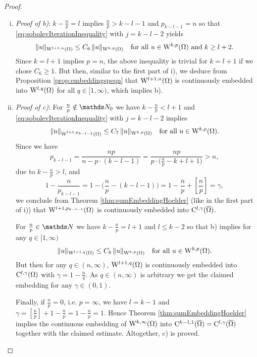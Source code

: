 \begin{proof}
\begin{enumerate}[i)]
\item \emph{Proof of b)}:
  $k - \frac{n}{p} = l$ implies $\frac{n}{p} > k - l - 1$ and $p_{k - l - 1} = n$ so that \eqref{eq:sobolevIterationInequality} with $j = k - l - 2$ yields
  $$
  \|u\|_{\mathrm{W}^{l + 1, n}(\Omega)} \leq C_6 \, \|u\|_{\mathrm{W}^{k,p}(\Omega)} \quad\text{for all } u \in \mathrm{W}^{k,p}(\Omega) \text{ and } k \geq l + 2.
  $$
  Since $k = l+1$ implies $p = n$, the above inequality is trivial for $k = l + 1$ if we chose $C_6 \geq 1$.
  But then, similar to the first part of i), we deduce from Proposition \ref{prop:embeddingspeqn} that $\mathrm{W}^{l+1,n}(\Omega)$ is continuously embedded into $\mathrm{W}^{l,q}(\Omega)$ for all $q \in [1,\infty)$, which implies b).
    
  \item \emph{Proof of c)}: For $\frac{n}{p} \notin\N_0$ we have $k - \frac{n}{p} < l + 1$ and \eqref{eq:sobolevIterationInequality} with $j = k - l - 2$ implies
    $$
  \|u\|_{\mathrm{W}^{l+1,p_{k - l - 1}}(\Omega)} \leq C_7 \, \|u\|_{\mathrm{W}^{k,p}(\Omega)} \quad\text{for all } u \in \mathrm{W}^{k,p}(\Omega).
    $$
    Since we have 
    $$
    p_{k - l - 1} = \frac{np}{n - p \cdot (k - l - 1)} = \frac{np}{p\cdot \Big( \frac{n}{p} - k + l + 1 \Big)} > n,
    $$ 
    due to $k - \frac{n}{p} > l$, and 
    $$
    1 - \frac{n}{p_{k - l - 1}} 
    = 1 - \Big(\frac{n}{p} - (k - l - 1)\Big)
    = 1 - \frac{n}{p} + \left[ \frac{n}{p} \right]
    = \gamma,
    $$
    we conclude from Theorem \ref{thm:sumEmbeddingHoelder} (like in the first part of i)) that $\mathrm{W}^{l+1,p_{k - l - 1}}(\Omega)$ is continuously embedded into $\mathrm{C}^{l,\gamma}(\overline\Omega)$.

    For $\frac{n}{p} \in \N$ we have $k - \frac{n}{p} = l + 1$ and $l \leq k - 2$ so that b) implies for any $q \in [1,\infty)$
      $$
      \|u\|_{\mathrm{W}^{l+1,q}(\Omega)} \leq C_8 \, \|u\|_{\mathrm{W}^{k,p}(\Omega)} \quad\text{for all } u \in \mathrm{W}^{k,p}(\Omega).
      $$
      But then for any $q \in (n,\infty)$, $\mathrm{W}^{l+1,q}(\Omega)$ is continuously embedded into $\mathrm{C}^{l,\gamma}(\Omega)$ with $\gamma = 1 - \frac{n}{q}$.
      As $q \in (n,\infty)$ is arbitrary we get the claimed embedding for any $\gamma \in (0,1)$.

      Finally, if $\frac{n}{p} = 0$, i.e. $p = \infty$, we have $l = k - 1$ and $\gamma = \left[ \frac{n}{p} \right] + 1 - \frac{n}{p} = 1 - \frac{n}{p} = 1$.
      Hence Theorem \ref{thm:sumEmbeddingHoelder} implies the continuous embedding of $\mathrm{W}^{k,\infty}(\Omega)$ into $\mathrm{C}^{k-1,1}(\overline\Omega) = \mathrm{C}^{l,\gamma}(\overline\Omega)$ together with the claimed estimate.
      Altogether, c) is proved. \qedhere
  \end{enumerate}
\end{proof}

